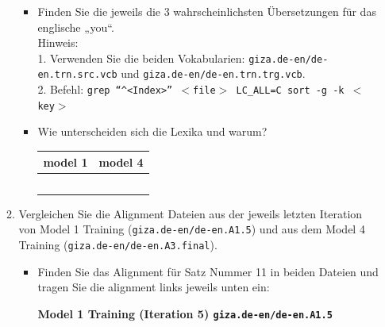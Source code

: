 \documentclass[12pt,fleqn]{article}
\begin{document}
\begin{enumerate}
\begin{enumerate}
\vspace{0.5cm} 
\begin{itemize} 
\item Finden Sie die jeweils die 3 wahrscheinlichsten Übersetzungen für das englische „you“. \\ 

Hinweis: \\ 
1. Verwenden Sie die beiden Vokabularien: \texttt{giza.de-en/de-en.trn.src.vcb} und \texttt{giza.de-en/de-en.trn.trg.vcb}.  \\
2. Befehl:  \texttt{grep ``\textasciicircum$<$Index$>$'' $<$file$>$ \textbar  LC\_ALL=C sort -g -k $<$key$>$} \\ 

\item Wie unterscheiden sich die Lexika und warum?


\begin{table}[h] 
 \begin{center} 
\begin{tabular}{|p{4cm}|l|p{4cm}|l|} \hline 
\multicolumn{2}{|p{6cm}|}{model 1} & \multicolumn{2}{|p{6cm}|}{model 4} \\ \hline 
& &  & \\ \hline 
 & &  & \\ \hline 
 & &  & \\ \hline 
 & &  & \\ \hline 
 & & & \\ \hline 
\end{tabular}
 \end{center}
\end{table}

\end{itemize}

\vspace{0.5cm} 
\item Vergleichen Sie die Alignment Dateien aus der jeweils letzten Iteration von Model 1 Training (\texttt{giza.de-en/de-en.A1.5}) und aus dem Model 4 Training (\texttt{giza.de-en/de-en.A3.final}).

\vspace{0.5cm} 
\begin{itemize} 
 \item Finden Sie das Alignment für Satz Nummer 11 in beiden Dateien und tragen Sie die alignment links jeweils unten ein:  
 
 
 \vspace{0.5cm}
  \textbf{Model 1 Training (Iteration 5) \texttt{giza.de-en/de-en.A1.5}} \\ 
  

\end{itemize}
\end{enumerate}
\end{enumerate}
\end{document}
